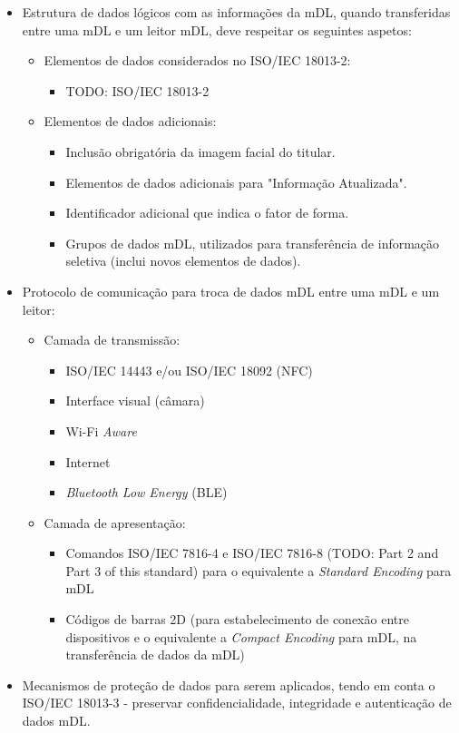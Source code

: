 \documentclass[11pt]{article}
\begin{document}
\begin{itemize}
	\item Estrutura de dados lógicos com as informações da mDL, quando transferidas entre uma mDL e um leitor mDL, deve respeitar os seguintes aspetos:
	\begin{itemize}
		\item Elementos de dados considerados no ISO/IEC 18013-2:
		\begin{itemize}
			\item TODO: ISO/IEC 18013-2
		\end{itemize}

		\item Elementos de dados adicionais:
		\begin{itemize}
			\item Inclusão obrigatória da imagem facial do titular.
			\item Elementos de dados adicionais para "Informação Atualizada".
			\item Identificador adicional que indica o fator de forma.
			\item Grupos de dados mDL, utilizados para transferência de informação seletiva (inclui novos elementos de dados).
		\end{itemize}
	\end{itemize}

	\item Protocolo de comunicação para troca de dados mDL entre uma mDL e um leitor:
	\begin{itemize}
		\item Camada de transmissão:
		\begin{itemize}
			\item ISO/IEC 14443 e/ou ISO/IEC 18092 (NFC)
			\item Interface visual (câmara)
			\item Wi-Fi \textit{Aware}
			\item Internet
			\item \textit{Bluetooth Low Energy} (BLE)
		\end{itemize}
		\item Camada de apresentação:
		\begin{itemize}
			\item Comandos ISO/IEC 7816-4 e ISO/IEC 7816-8 (TODO: Part 2 and Part 3 of this standard) para o equivalente a \textit{Standard Encoding} para mDL
			\item Códigos de barras 2D (para estabelecimento de conexão entre dispositivos e o equivalente a \textit{Compact Encoding} para mDL, na transferência de dados da mDL)
		\end{itemize}
	\end{itemize}

	\item Mecanismos de proteção de dados para serem aplicados, tendo em conta o ISO/IEC 18013-3 - preservar confidencialidade, integridade e autenticação de dados mDL.
\end{itemize}
\end{document}
